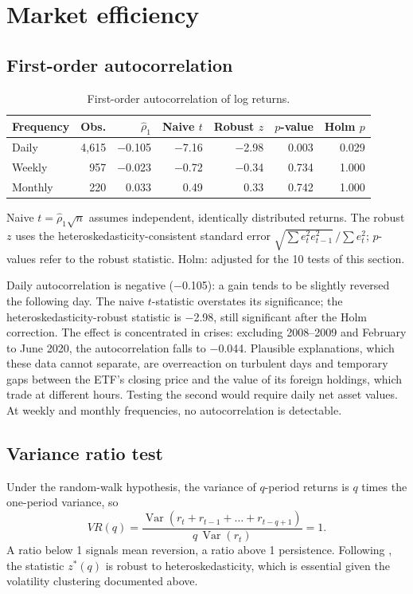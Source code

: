 \documentclass[11pt,a4paper]{article}
\newcommand{\keep}[1]{\Needspace{#1\baselineskip}}
\newcommand{\note}[1]{{\footnotesize\color{muted}#1\par}}
\begin{document}
\keep{24}
\section{Market efficiency}

\subsection{First-order autocorrelation}
\begin{table}[H]
\small
\caption{First-order autocorrelation of log returns.}
\begin{tabularx}{\linewidth}{L r r r r r r}
\toprule
\textbf{Frequency} & \textbf{Obs.} & \textbf{$\hat\rho_1$} & \textbf{Naive $t$} & \textbf{Robust $z$} & \textbf{$p$-value} & \textbf{Holm $p$} \\
\midrule
Daily & 4,615 & $-$0.105 & $-$7.16 & $-$2.98 & 0.003 & 0.029 \\
Weekly & 957 & $-$0.023 & $-$0.72 & $-$0.34 & 0.734 & 1.000 \\
Monthly & 220 & 0.033 & 0.49 & 0.33 & 0.742 & 1.000 \\
\bottomrule
\end{tabularx}
\end{table}
\note{Naive $t = \hat\rho_1\sqrt{n}$ assumes independent, identically distributed returns. The robust $z$ uses the heteroskedasticity-consistent standard error $\sqrt{\sum e_t^2 e_{t-1}^2}\,/\sum e_t^2$; $p$-values refer to the robust statistic. Holm: adjusted for the 10 tests of this section.}

Daily autocorrelation is negative ($-$0.105): a gain tends to be slightly reversed the following day. The naive $t$-statistic overstates its significance; the heteroskedasticity-robust statistic is $-$2.98, still significant after the Holm correction. The effect is concentrated in crises: excluding 2008--2009 and February to June 2020, the autocorrelation falls to $-$0.044. Plausible explanations, which these data cannot separate, are overreaction on turbulent days and temporary gaps between the ETF's closing price and the value of its foreign holdings, which trade at different hours. Testing the second would require daily net asset values. At weekly and monthly frequencies, no autocorrelation is detectable.

\keep{16}\subsection{Variance ratio test}
Under the random-walk hypothesis, the variance of $q$-period returns is $q$ times the one-period variance, so
\[
VR(q) = \frac{\operatorname{Var}\left(r_t + r_{t-1} + \dots + r_{t-q+1}\right)}{q \,\operatorname{Var}(r_t)} = 1 .
\]
A ratio below 1 signals mean reversion, a ratio above 1 persistence. Following \citet{lo1988}, the statistic $z^*(q)$ is robust to heteroskedasticity, which is essential given the volatility clustering documented above.
\end{document}
